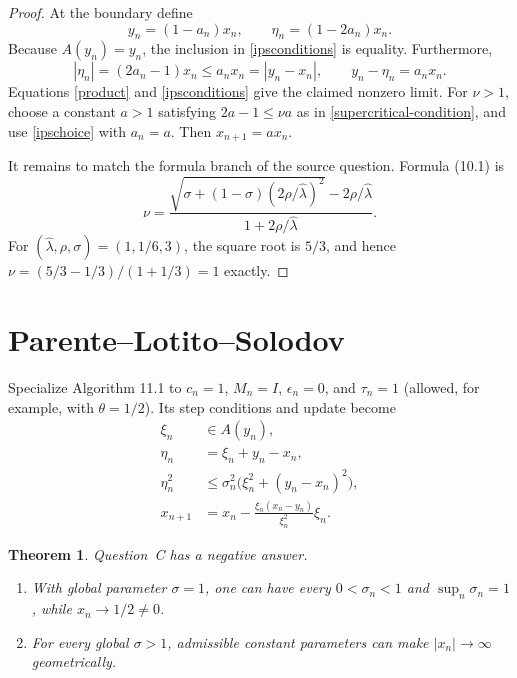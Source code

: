 \documentclass[11pt]{article}
\newtheorem{theorem}{Theorem}
\begin{document}
\begin{proof}
At the boundary define
\begin{equation}\label{ipschoice}
 y_n=(1-a_n)x_n,\qquad \eta_n=(1-2a_n)x_n.
\end{equation}
Because $A(y_n)=y_n$, the inclusion in \eqref{ipsconditions} is equality.
Furthermore,
\[
 |\eta_n|=(2a_n-1)x_n\le a_nx_n=|y_n-x_n|,
 \qquad y_n-\eta_n=a_nx_n.
\]
Equations \eqref{product} and \eqref{ipsconditions} give the claimed nonzero
limit.  For $\nu>1$, choose a constant $a>1$ satisfying
$2a-1\le\nu a$ as in \eqref{supercritical-condition}, and use
\eqref{ipschoice} with $a_n=a$.  Then $x_{n+1}=ax_n$.

It remains to match the formula branch of the source question.  Formula
(10.1) is
\[
 \nu=\frac{
 \sqrt{\sigma+(1-\sigma)(2\rho/\widehat\lambda)^2}
 -2\rho/\widehat\lambda}
 {1+2\rho/\widehat\lambda}.
\]
For $(\widehat\lambda,\rho,\sigma)=(1,1/6,3)$, the square root is $5/3$,
and hence $\nu=(5/3-1/3)/(1+1/3)=1$ exactly.
\end{proof}

\section{Parente--Lotito--Solodov}

Specialize Algorithm 11.1 to $c_n=1$, $M_n=I$, $\epsilon_n=0$, and
$\tau_n=1$ (allowed, for example, with $\theta=1/2$).  Its step conditions
and update become
\begin{align}
 \xi_n&\in A(y_n),\label{pls1}\\
 \eta_n&=\xi_n+y_n-x_n,\label{pls2}\\
 \eta_n^2&\le\sigma_n^2\bigl(\xi_n^2+(y_n-x_n)^2\bigr),\label{pls3}\\
 x_{n+1}&=x_n-\frac{\xi_n(x_n-y_n)}{\xi_n^2}\xi_n.
 \label{plsupdate}
\end{align}

\begin{theorem}\label{pls-theorem}
Question~C has a negative answer.
\begin{enumerate}
\item With global parameter $\sigma=1$, one can have every
$0<\sigma_n<1$ and $\sup_n\sigma_n=1$, while $x_n\to1/2\ne0$.
\item For every global $\sigma>1$, admissible constant parameters can make
$|x_n|\to\infty$ geometrically.
\end{enumerate}
\end{theorem}
\end{document}
